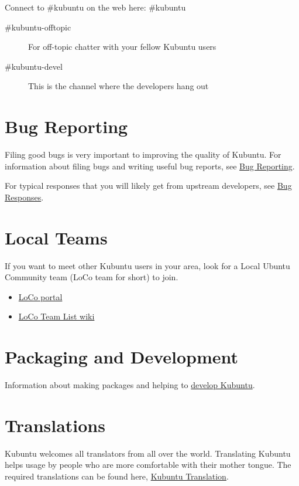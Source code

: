 \documentclass[letterpaper,10pt,english]{sphinxmanual}
\begin{document}
Connect to \#kubuntu on the web here: \#kubuntu
\begin{description}
\item[{\#kubuntu-offtopic}] \leavevmode
For off-topic chatter with your fellow Kubuntu users

\item[{\#kubuntu-devel}] \leavevmode
This is the channel where the developers hang out

\end{description}


\section{Bug Reporting}
\label{\detokenize{docs/contribute:bug-reporting}}
Filing good bugs is very important to improving the quality of Kubuntu. For information about filing bugs and writing useful bug reports, see \href{https://wiki.kubuntu.org/Kubuntu/Bugs/Reporting}{Bug Reporting}.

For typical responses that you will likely get from upstream  developers, see \href{https://community.kde.org/Kubuntu/BugTriage}{Bug Responses}.


\section{Local Teams}
\label{\detokenize{docs/contribute:local-teams}}
If you want to meet other Kubuntu users in your area, look for a Local Ubuntu Community team (LoCo team for short) to join.
\begin{itemize}
\item {} 
\href{http://loco.ubuntu.com/}{LoCo portal}

\item {} 
\href{https://wiki.ubuntu.com/LoCoTeams}{LoCo Team List wiki}

\end{itemize}


\section{Packaging and Development}
\label{\detokenize{docs/contribute:packaging-and-development}}
Information about making packages and helping to \href{https://wiki.kubuntu.org/Kubuntu/GettingInvolved/Development}{develop Kubuntu}.


\section{Translations}
\label{\detokenize{docs/contribute:translations}}
Kubuntu welcomes all translators from all over the world. Translating Kubuntu helps usage by people who are more comfortable with their mother tongue. The required translations can be found here, \href{https://community.kde.org/Kubuntu/Translation}{Kubuntu Translation}.
\end{document}
